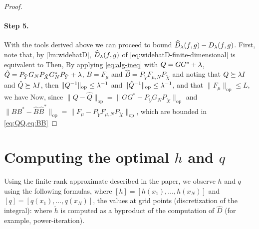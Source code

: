 \begin{proof}
\paragraph{Step 5.}
With the tools derived above we can proceed to bound $\widehat{D}_\lambda(f,g) - D_\lambda(f,g)$.
First, note that, by \cref{lm:widehatD}, $\widehat{D}_\lambda(f,g)$ of \cref{eq:widehatD-finite-dimensional} is equivalent to
Then,
By applying \cref{eq:alg-ineq} with $Q = GG^* + \lambda$, $\hat{Q} = P_{\tilde{Y}} G_N P_{\tilde{X}} G_N^*P_{\tilde{Y}} + \lambda$, $B = F_{\mu}$ and $\hat{B} = P_{\tilde{Y}} F_{\mu, N} P_{\tilde{X}}$ and noting that $Q \succeq \lambda I$ and $\hat{Q} \succeq \lambda I$, then $\|Q^{-1}\|_{\mathrm{op}} \leq \lambda^{-1}$ and $\|\hat{Q}^{-1}\|_{\mathrm{op}} \leq \lambda^{-1}$,
and that $\|F_{\mu}\|_{\mathrm{op}} \leq L$, we have
Now, since $\|Q - \hat{Q}\|_{\mathrm{op}} = \|GG^* - P_{\tilde{Y}}G_{N} P_{\tilde{X}}\|_{\mathrm{op}}$ and  $\|BB^* - \hat{B}\hat{B}^*\|_{\mathrm{op}} = \|F_\mu - P_{\tilde{Y}}F_{\mu,N} P_{\tilde{X}}\|_{\mathrm{op}}$, which are bounded in \cref{eq:QQ,eq:BB}
\end{proof}


\section{Computing the optimal $h$ and $q$}\label{sec:appendix-hq}

Using the finite-rank approximate described in the paper, we observe $h$ and $q$ using the following formulas, where $[h] = [h(x_1), \ldots, h(x_N)]$ and $[q] = [q(x_1), \ldots, q(x_N)]$, the values at grid points (discretization of the integral):
where $\widetilde h$ is computed as a byproduct of the computation of $\widehat D$ (for example, power-iteration).
